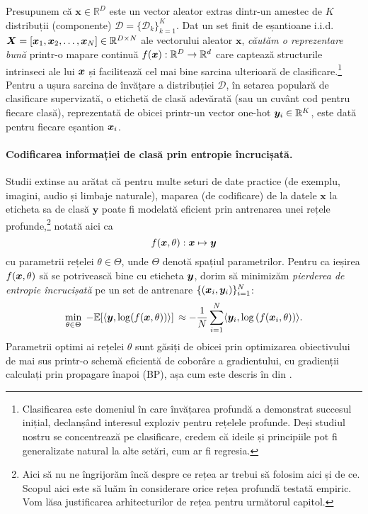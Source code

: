 \documentclass[../../book-main_ro.tex]{subfiles}
\begin{document}
Presupunem că $\bm{x} \in \mathbb{R}^D$ este un vector aleator extras dintr-un amestec de $K$ distribuții (componente) $\mathcal{D} = \{\mathcal{D}_k\}_{k=1}^K$. Dat un set finit de eșantioane i.i.d. $\bm{X} = [\bm{x}_1, \bm{x}_2, \ldots, \bm{x}_N] \in \mathbb{R}^{D\times N}$ ale vectorului aleator $\bm x$, {\em căutăm o reprezentare bună} printr-o mapare continuă $f(\bm{x}): \mathbb{R}^D \rightarrow \mathbb{R}^d$ care captează structurile intrinseci ale lui $\bm{x}$ și facilitează cel mai bine sarcina ulterioară de clasificare.\footnote{Clasificarea este domeniul în care învățarea profundă a demonstrat succesul inițial, declanșând interesul exploziv pentru rețelele profunde. Deși studiul nostru se concentrează pe clasificare, credem că ideile și principiile pot fi generalizate natural la alte setări, cum ar fi regresia.} Pentru a ușura sarcina de învățare a distribuției $\mathcal{D}$, în setarea populară de clasificare supervizată, o etichetă de clasă adevărată (sau un cuvânt cod pentru fiecare clasă), reprezentată de obicei printr-un vector one-hot $\bm{y}_i \in \mathbb{R}^K$, este dată pentru fiecare eșantion $\bm{x}_i$.

\paragraph{Codificarea informației de clasă prin entropie încrucișată.} Studii extinse au arătat că pentru multe seturi de date practice (de exemplu, imagini, audio și limbaje naturale), maparea (de codificare) de la datele $\bm{x}$ la eticheta sa de clasă $\bm{y}$ poate fi modelată eficient prin antrenarea unei rețele profunde,\footnote{Aici să nu ne îngrijorăm încă despre ce rețea ar trebui să folosim aici și de ce. Scopul aici este să luăm în considerare orice rețea profundă testată empiric. Vom lăsa justificarea arhitecturilor de rețea pentru următorul capitol.} notată aici ca $$f(\bm{x}, \theta):\bm{x} \mapsto \bm{y}$$ cu parametrii rețelei $\theta \in \Theta$, unde $\Theta$ denotă spațiul parametrilor. Pentru ca ieșirea $f(\bm{x}, \theta)$ să se potrivească bine cu eticheta $\bm{y}$, dorim să minimizăm {\em pierderea de entropie încrucișată} pe un set de antrenare $\{(\bm{x}_i, \bm{y}_i)\}_{i=1}^N$:
\begin{equation}
   \min_{\theta \in \Theta} \; - \mathbb{E}[\langle \bm{y}, \log(f(\bm{x}, \theta)) \rangle] \, \approx - \frac{1}{N}\sum_{i=1}^N \langle \bm{y}_i, \log\left(f(\bm{x}_i, \theta)\right) \rangle.
   \label{chap4-eqn:cross-entropy}
\end{equation}
Parametrii optimi ai rețelei $\theta$ sunt găsiți de obicei prin optimizarea obiectivului de mai sus printr-o schemă eficientă de coborâre a gradientului, cu gradienții calculați prin propagare înapoi (BP), așa cum este descris în  din .
\end{document}
